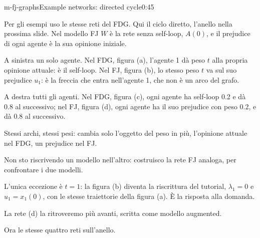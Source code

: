 
\begin{slide}{m-fj-graphs}{Example networks: directed cycle}{0:45}
  \begin{discorso}
    \item Per gli esempi uso le stesse reti del FDG. Qui il ciclo diretto, l'anello nella prossima slide. Nel modello FJ $W$ è la rete senza self-loop, $A(0)$, e il prejudice di ogni agente è la sua opinione iniziale.
    \item A sinistra un solo agente. Nel FDG, figura (a), l'agente 1 dà peso $t$ alla propria opinione attuale: è il self-loop. Nel FJ, figura (b), lo stesso peso $t$ va sul suo prejudice $u_1$: è la freccia che entra nell'agente 1, che non è un arco del grafo.
    \item A destra tutti gli agenti. Nel FDG, figura (c), ogni agente ha self-loop 0.2 e dà 0.8 al successivo; nel FJ, figura (d), ogni agente ha il suo prejudice con peso 0.2, e dà 0.8 al successivo.
    \item Stessi archi, stessi pesi: cambia solo l'oggetto del peso in più, l'opinione attuale nel FDG, un prejudice nel FJ.
    \item Non sto riscrivendo un modello nell'altro: costruisco la rete FJ analoga, per confrontare i due modelli.
    \item L'unica eccezione è $t=1$: la figura (b) diventa la riscrittura del tutorial, $\lambda_1=0$ e $u_1=x_1(0)$, con le stesse traiettorie della figura (a). È la risposta alla domanda.
    \item La rete (d) la ritroveremo più avanti, scritta come modello augmented.
    \item Ora le stesse quattro reti sull'anello.
  \end{discorso}
\end{slide}

